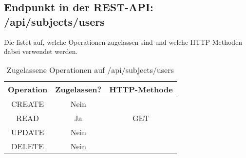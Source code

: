\subsection{Endpunkt in der REST-API: /api/subjects/users}
Die  listet auf, welche Operationen zugelassen sind und welche HTTP-Methoden dabei verwendet werden. 

\begin{table}[!htbp]
	\begin{tabular}{|c|c|c|}
		\hline
			\textbf{Operation} & \textbf{Zugelassen?} & \textbf{HTTP-Methode} \\ \hline
			CREATE & Nein & \\ \hline 
			READ & Ja & GET \\ \hline
			UPDATE & Nein & \\ \hline 
			DELETE & Nein & \\ \hline
	\end{tabular}

		\caption{Zugelassene Operationen auf /api/subjects/users}
		\label{tab:end:rest:api:subjects:users:meth}
\end{table}

